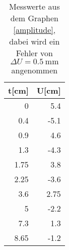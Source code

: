 \begin{table}
\begin{center}
\begin{tabular}{r|r}
t[cm] & U[cm] \\
\hline
0 & 5.4 \\
0.4 & -5.1 \\
0.9 & 4.6 \\
1.3 & -4.3 \\
1.75 & 3.8 \\
2.25 & -3.6 \\
3.6 & 2.75 \\
5 & -2.2 \\
7.3 & 1.3 \\
8.65 & -1.2\\
\end{tabular}
\caption[Messwerte zu a]{Messwerte aus dem Graphen \eqref{amplitude}, dabei wird ein Fehler von $\Delta U = \SI{0.5}{\milli \meter}$ angenommen}
\label{werte_a}
\end{center}
\end{table}
